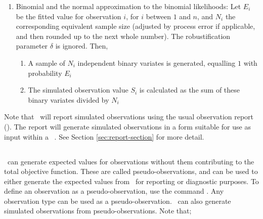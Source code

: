 {{{{{{\begin{enumerate}
  \begin{enumerate}
    \item{} A sample of $N$ values from $1$ to $n$ is generated using the binomial distribution, using sample probabilities proportional to the values of $E_i$
    \item{} Each simulated observation value $S_i$ is calculated as the proportion of the $N$ sampled values equalling $i$
    \item{} The simulated observation values $S_i$ are then rescaled so that their sum is equal to $1$
  \end{enumerate}
\item{} Binomial and the normal approximation to the binomial likelihoods: Let $E_i$ be the fitted value for observation $i$, for $i$ between $1$ and $n$, and $N_i$ the corresponding equivalent sample size (adjusted by process error if applicable, and then rounded up to the next whole number). The robustification parameter $\delta$ is ignored. Then, 
  \begin{enumerate}
    \item{} A sample of $N_i$ independent binary variates is generated, equalling $1$ with probability $E_i$ 
    \item{}	The simulated observation value $S_i$ is calculated as the sum of these binary variates divided by $N_i$
  \end{enumerate}
\end{enumerate}

Note that \SPM\ will report simulated observations using the usual observation report (). The report  will generate simulated observations in a form suitable for use as input within a \SPM\ \config. See Section \ref{sec:report-section} for more detail.

\subsection{}

\SPM\ can generate expected values for observations without them contributing to the total objective function. These are called pseudo-observations, and can be used to either generate the expected values from \SPM\ for reporting or diagnostic purposes. To define an observation as a pseudo-observation, use the command . Any observation type can be used as a pseudo-observation. \SPM\ can also generate simulated observations from pseudo-observations. Note that;

}}}}}}
